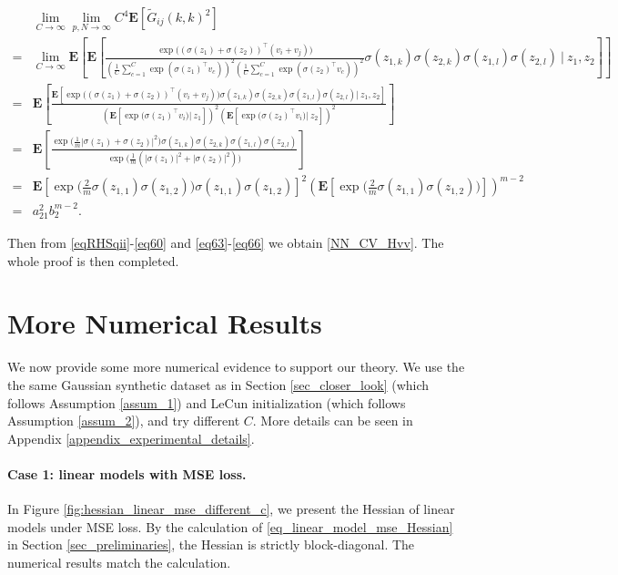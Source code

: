 \documentclass{article}
\newcommand{\E}{\mathbf{E}}
\newcommand{\wt}{\widetilde}
\newcommand{\rw}{\rightarrow}
\newcommand{\1}{^{(1)}}
\newcommand{\2}{^{(2)}}
\renewcommand{\l}{\left}
\renewcommand{\r}{\right}
\newcommand{\bea}{\begin{equation}\begin{aligned}}
\newcommand{\eea}{\end{aligned}\end{equation}}
\begin{document}
\bea\label{eq66}
&\lim_{C\rw\infty}\lim_{p,N\rw\infty}C^4\E\l[\wt{G}_{ij}(k,k)^2\r]\\
=&\lim_{C\rw\infty}\E\l[\E\l[\frac{\exp\big((\sigma(z_1)+\sigma(z_2))^\top (v_i+v_j)\big)}{\l(\frac{1}{C}\sum_{c=1}^C\exp(\sigma(z_1)^\top v_c)\r)^2\l(\frac{1}{C}\sum_{c=1}^C\exp(\sigma(z_2)^\top v_c)\r)^2}\sigma(z_{1,k})\sigma(z_{2,k})\sigma(z_{1,l})\sigma(z_{2,l})\ \bigg|\ z_1,z_2 \r]\r]\\
=&\E\l[\frac{\E\l[ \exp\big((\sigma(z_1)+\sigma(z_2))^\top (v_i+v_j)\big)\sigma(z_{1,k})\sigma(z_{2,k})\sigma(z_{1,l})\sigma(z_{2,l}) \bigg|\ z_1,z_2 \r]}{\l(\E\l[ \exp\big(\sigma(z_1)^\top v_i\big)\bigg|\ z_1 \r]\r)^2\l(\E\l[\exp\big(\sigma(z_2)^\top v_i\big)\bigg|\ z_2 \r]\r)^2}\r]\\
=&\E\l[ \frac{\exp\big(\frac{1}{m}|\sigma(z_1)+\sigma(z_2)|^2\big)\sigma(z_{1,k})\sigma(z_{2,k})\sigma(z_{1,l})\sigma(z_{2,l})}{\exp\big(\frac{1}{m}(|\sigma(z_1)|^2+|\sigma(z_2)|^2)\big)} \r]\\
=&\E\l[\exp\big(\frac{2}{m}\sigma(z_{1,1})\sigma(z_{1,2})\big)\sigma(z_{1,1})\sigma(z_{1,2})\r]^2\l( \E\l[\exp\big(\frac{2}{m}\sigma(z_{1,1})\sigma(z_{1,2})\big)\r] \r)^{m-2}\\
=&a_{21}^2b_2^{m-2}.
\eea

Then from \eqref{eqRHSqii}-\eqref{eq60} and \eqref{eq63}-\eqref{eq66} we obtain \eqref{NN_CV_Hvv}. The whole proof is then completed.



\clearpage
\section{More Numerical Results}
\label{sec_experiments}


We now provide some more numerical evidence to support our theory.  We use the  the same Gaussian synthetic dataset as in Section \ref{sec_closer_look} (which follows Assumption \ref{assum_1}) and LeCun initialization (which follows Assumption \ref{assum_2}),  and try different $C$. More details can be seen in Appendix \ref{appendix_experimental_details}.







\paragraph{Case 1: linear models with MSE loss.} In Figure \ref{fig:hessian_linear_mse_different_c}, we present the Hessian of linear models under MSE loss. By the calculation of \eqref{eq_linear_model_mse_Hessian} in Section \ref{sec_preliminaries}, the Hessian is strictly block-diagonal.  The numerical results match the calculation.
\end{document}
